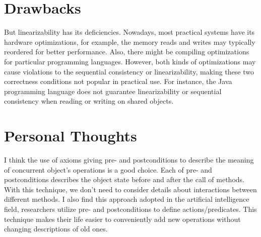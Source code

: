 \documentclass[10pt, letterpaper]{article}
\begin{document}
\section{Drawbacks}
\label{sec-drawbacks}
But linearizability has its deficiencies. Nowadays, most practical systems have its hardware optimizations, for example, the memory reads and writes may typically reordered for better performance. Also, there might be compiling optimizations for particular programming languages. However, both kinds of optimizations may cause violations to the sequential consistency or linearizability, making these two correctness conditions not popular in practical use. For instance, the Java programming language does not guarantee linearizability or sequential consistency when reading or writing on shared objects.~\cite{AMP}

\section{Personal Thoughts}
\label{sec-thoughts}
I think the use of axioms giving pre- and postconditions to describe the meaning of concurrent object's operations is a good choice. Each of pre- and postconditions describes the object state before and after the call of methods. With this technique, we don't need to consider details about interactions between different methods. I also find this approach adopted in the artificial intelligence field, researchers utilize pre- and postconditions to define actions/predicates. This technique makes their life easier to conveniently add new operations without changing descriptions of old ones.



\end{document}
